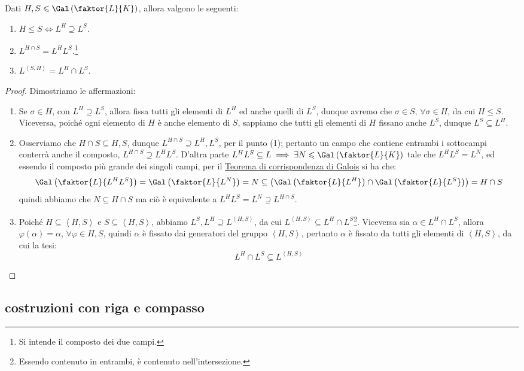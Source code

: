 \documentclass[11pt]{scrartcl}
\begin{document}
\begin{proposition}
Dati $H,S \leqslant \Gal\left(\faktor{L}{K}\right)$, allora valgono le seguenti:
\begin{enumerate}[(1)]
    \item $H \leqslant  S \iff L^H \supseteq L^S$.
    \item $L^{H \cap S} = L^H L^S$.\footnote{Si intende il composto dei due campi.} 
    \item $L^{\left<S,H\right>} = L^H \cap L^S$.
\end{enumerate}
\end{proposition}

\begin{proof}
Dimostriamo le affermazioni:
\begin{enumerate}[(1)]
    \item Se $\sigma \in H$, con $L^H \supseteq L^S$, allora fissa tutti gli elementi di $L^H$ ed anche quelli di $L^S$, dunque avremo che $\sigma \in S$, $\forall \sigma \in H$, da cui $H \leqslant S$. Viceversa,
    poiché ogni elemento di $H$ è anche elemento di $S$, sappiamo che tutti gli elementi di $H$ fissano anche $L^S$, dunque $L^S \subseteq L^H$.
    \item Osserviamo che $H \cap S \subseteq H,S$, dunque $L^{H\cap S} \supseteq L^H,L^S$, per il punto (1); pertanto un campo che contiene entrambi i sottocampi 
    conterrà anche il composto, $L^{H \cap S} \supseteq L^H L^S$. D'altra parte $L^H L^S \subseteq L \implies \exists N \leqslant \Gal\left(\faktor{L}{K}\right) $
    tale che $L^H L^S = L^N$, ed essendo il composto più grande dei singoli campi, per il \hyperref[corrG]{Teorema di corrispondenza di Galois} si ha che:
    \[ \Gal\left(\faktor{L}{L^HL^S}\right) = \Gal\left(\faktor{L}{L^N}\right) = N \subseteq \left(\Gal\left(\faktor{L}{L^H}\right) \cap \Gal\left(\faktor{L}{L^S}\right)\right) = H \cap S
        \]
    quindi abbiamo che $N \subseteq H \cap S$ ma ciò è equivalente a $ L^HL^S= L^N \supseteq L^{H \cap S}$.
    \item Poiché $H \subseteq \left<H,S\right>$ e $S \subseteq \left<H,S\right>$, abbiamo $L^S,L^H \supseteq L^{\left<H,S\right>}$, da cui $L^{\left<H,S\right>} \subseteq L^H \cap L^S$\footnote{Essendo contenuto in entrambi, è contenuto nell'intersezione.}.
    Viceversa sia $\alpha \in L^H \cap L^S$, allora $\varphi(\alpha) = \alpha$, $\forall \varphi \in H,S$, quindi $\alpha$ è fissato dai generatori
    del gruppo $\left<H,S\right>$, pertanto $\alpha$ è fissato da tutti gli elementi di $\left<H,S\right>$, da cui la tesi:
    \[ L^H \cap L^S \subseteq L^{\left<H,S\right>}
        \]
\end{enumerate}
\end{proof}

\newpage
\subsection{costruzioni con riga e compasso}
\end{document}
